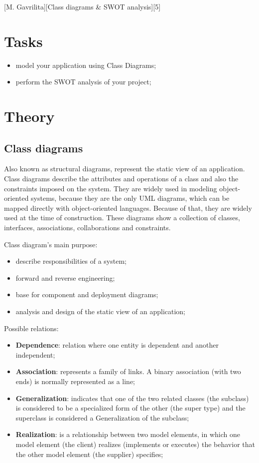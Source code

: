 \documentclass{article}
\begin{document}
	[M. Gavrilita][Class diagrams \& SWOT analysis][5]


	\section{Tasks}
		\begin{itemize}
			\item model your application using Class Diagrams;
			\item perform the SWOT analysis of your project;
		\end{itemize}

	\section{Theory}
		\subsection{Class diagrams}
			Also known as structural diagrams, represent the static view of an application. Class diagrams describe the attributes and operations of a class and also the constraints imposed on the system. They are widely used in modeling object-oriented systems, because they are the only UML diagrams, which can be mapped directly with object-oriented languages. Because of that, they are widely used at the time of construction. These diagrams show a collection of classes, interfaces, associations, collaborations and constraints.

			\bigskip
			Class diagram's main purpose:
			\begin{itemize}
				\item describe responsibilities of a system;
				\item forward and reverse engineering;
				\item base for component and deployment diagrams;
				\item analysis and design of the static view of an application;
			\end{itemize}

			\bigskip
			Possible relations:
			\begin{itemize}
				\item \textbf{Dependence}: relation where one entity is dependent and another independent;
				\item \textbf{Association}: represents a family of links. A binary association (with two ends) is normally represented as a line;
				\item \textbf{Generalization}: indicates that one of the two related classes (the subclass) is considered to be a specialized form of the other (the super type) and the superclass is considered a Generalization of the subclass;
				\item \textbf{Realization}: is a relationship between two model elements, in which one model element (the client) realizes (implements or executes) the behavior that the other model element (the supplier) specifies;
			\end{itemize}
\end{document}
